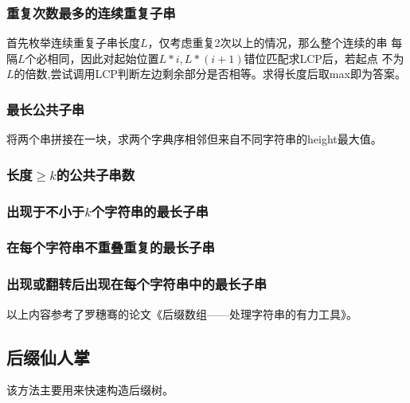 \subsubsection{重复次数最多的连续重复子串}
首先枚举连续重复子串长度$L$，仅考虑重复2次以上的情况，那么整个连续的串
每隔$L$个必相同，因此对起始位置$L*i,L*(i+1)$错位匹配求LCP后，若起点
不为$L$的倍数,尝试调用LCP判断左边剩余部分是否相等。求得长度后取max即为答案。
\subsubsection{最长公共子串}
将两个串拼接在一块，求两个字典序相邻但来自不同字符串的height最大值。
\subsubsection{长度$\geq k$的公共子串数}

\subsubsection{出现于不小于$k$个字符串的最长子串}
\subsubsection{在每个字符串不重叠重复的最长子串}
\subsubsection{出现或翻转后出现在每个字符串中的最长子串}

以上内容参考了罗穗骞的论文《后缀数组——处理字符串的有力工具》。
\subsection{后缀仙人掌}
该方法主要用来快速构造后缀树。
